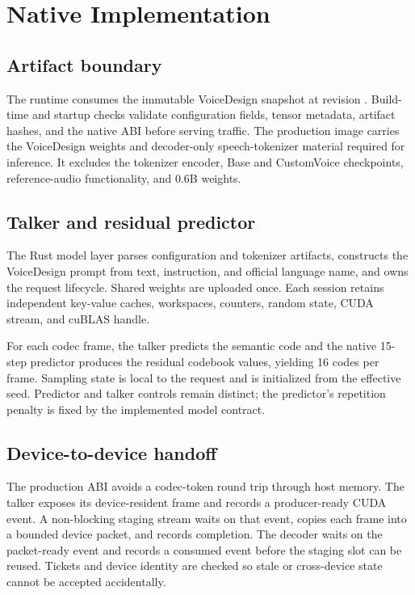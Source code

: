 \section{Native Implementation}

\subsection{Artifact boundary}

The runtime consumes the immutable VoiceDesign snapshot at revision
.
Build-time and startup checks
validate configuration fields, tensor metadata, artifact hashes, and the
native ABI before serving traffic. The production image carries the
VoiceDesign weights and decoder-only speech-tokenizer material required for
inference. It excludes the tokenizer encoder, Base and CustomVoice checkpoints,
reference-audio functionality, and 0.6B weights.

\subsection{Talker and residual predictor}

The Rust model layer parses configuration and tokenizer artifacts, constructs
the VoiceDesign prompt from text, instruction, and official language name, and
owns the request lifecycle. Shared weights are uploaded once. Each session
retains independent key-value caches, workspaces, counters, random state, CUDA
stream, and cuBLAS handle.

For each codec frame, the talker predicts the semantic code and the native
15-step predictor produces the residual codebook values, yielding 16 codes per
frame. Sampling state is local to the request and is initialized from the
effective seed. Predictor and talker controls remain distinct; the predictor's
repetition penalty is fixed by the implemented model contract.

\subsection{Device-to-device handoff}

The production ABI avoids a codec-token round trip through host memory. The
talker exposes its device-resident frame and records a producer-ready CUDA
event. A non-blocking staging stream waits on that event, copies each frame into
a bounded device packet, and records completion. The decoder waits on the
packet-ready event and records a consumed event before the staging slot can be
reused. Tickets and device identity are checked so stale or cross-device state
cannot be accepted accidentally.

